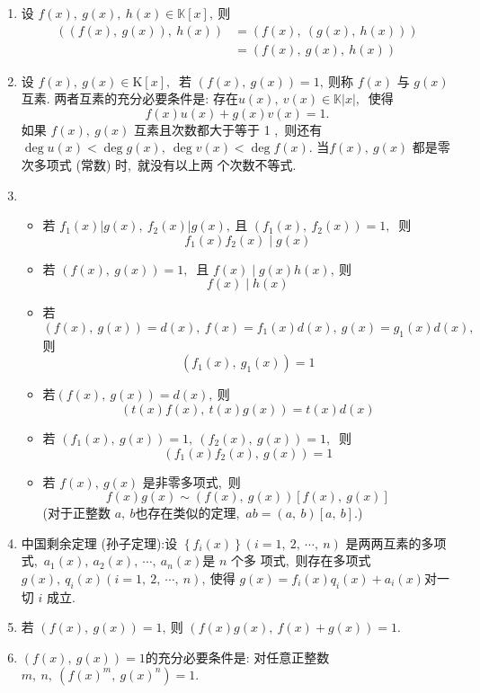 \begin{enumerate}
		\item 设  $f(x),\  g(x),\  h(x) \in \mathbb{K}[x] ,\  $则
		$$\begin{aligned}
			((f(x),\  g(x)),\  h(x)) &=(f(x),\ (g(x),\  h(x))) \\
			&=(f(x),\  g(x),\  h(x))
		\end{aligned}$$
		
		\item 设  $f(x),\  g(x) \in \mathrm{K}[x] ,\ $ 若  $(f(x),\  g(x))=1 ,\  $则称  $f(x)$  与 $ g(x) $ 互素. 两者互素的充分必要条件是:
		存在$  u(x),\  v(x) \in \mathbb{K}|x| ,\ $ 使得
		$$f(x) u(x)+g(x) v(x)=1 .$$
		如果 $ f(x),\  g(x) $ 互素且次数都大于等于 1 ,\  则还有 $ \operatorname{deg} u(x)<\operatorname{deg} g(x),\  \operatorname{deg} v(x)<\operatorname{deg} f(x) .$
		当$  f(x),\  g(x)$  都是零次多项式 (常数) 时,\  就没有以上两 个次数不等式.
		\item
		\begin{itemize}
			\item 若 $ f_{1}(x)\left|g(x),\  f_{2}(x)\right| g(x) ,\  $且  $\left(f_{1}(x),\  f_{2}(x)\right)=1 ,\ $ 则
			$$f_{1}(x) f_{2}(x) \mid g(x)$$
			\item 若 $ (f(x),\  g(x))=1 ,\ $ 且  $f(x) \mid g(x) h(x) ,\  $则
			$$f(x) \mid h(x)$$
			\item 若  $(f(x),\  g(x))=d(x),\  f(x)=f_{1}(x) d(x),\  g(x)=   g_{1}(x) d(x) ,\ $ 则
			$$\left(f_{1}(x),\  g_{1}(x)\right)=1$$
			\item 若$ (f(x),\  g(x))=d(x) ,\  $则
			$$(t(x) f(x),\  t(x) g(x))=t(x) d(x)$$
			\item 若  $\left(f_{1}(x),\  g(x)\right)=1,\ \left(f_{2}(x),\  g(x)\right)=1 ,\ $ 则
			$$\left(f_{1}(x) f_{2}(x),\  g(x)\right)=1$$
			\item 若 $f(x),\  g(x) $ 是非零多项式,\  则
			$$f(x) g(x) \sim(f(x),\  g(x))[f(x),\  g(x)]$$
			(对于正整数  $a,\  b  $也存在类似的定理,\   $a b=(a,\  b)[a,\  b] .$)
		\end{itemize}
		\item 中国剩余定理 (孙子定理):设 $ \left\{f_{i}(x)\right\}(i=1,\ 2,\  \cdots,\  n)$  是两两互素的多项式,\  $ a_{1}(x),\  a_{2}(x),\  \cdots,\  a_{n}(x)  $是 $ n$  个多 项式,\  则存在多项式  $g(x),\  q_{i}(x)(i=1,\ 2,\  \cdots,\  n) ,\  $使得  $g(x)=f_{i}(x) q_{i}(x)+a_{i}(x)  $对一切  $i$  成立.
		\item 若 $ (f(x),\  g(x))=1 ,\  $则  $(f(x) g(x),\  f(x)+g(x))=1 .$
		\item  $(f(x),\  g(x))=1  $的充分必要条件是: 对任意正整数$  m,\  n ,\   \left(f(x)^{m},\  g(x)^{n}\right)=1 .$

\end{enumerate}
